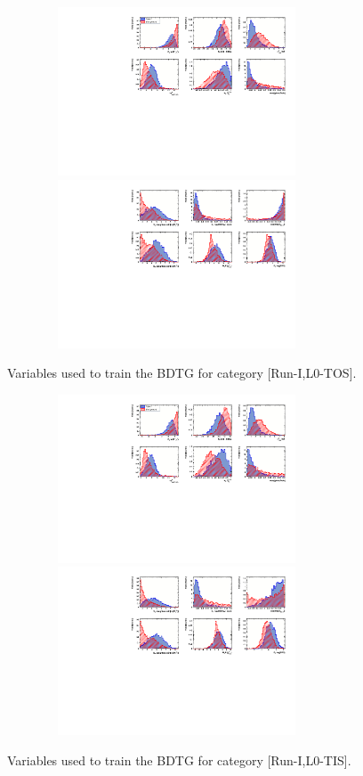 \setcounter{figure}{0}
\setcounter{table}{0}

\renewcommand{\thefigure}{C.\arabic{figure}}
\renewcommand{\thetable}{C.\arabic{table}}

\begin{figure}[h]
\centering
\includegraphics[height=5cm,width=0.9\textwidth]{figs/TMVA/BDTG_Data_run1_t0_all/variables_id_c1.pdf}
\includegraphics[height=5cm,width=0.9\textwidth]{figs/TMVA/BDTG_Data_run1_t0_all/variables_id_c2.pdf}
\caption{Variables used to train the BDTG for category [Run-I,\textsf{L0-TOS}].}
\label{fig:}
\includegraphics[height=5cm,width=0.9\textwidth]{figs/TMVA/BDTG_Data_run1_t1_all/variables_id_c1.pdf}
\includegraphics[height=5cm,width=0.9\textwidth]{figs/TMVA/BDTG_Data_run1_t1_all/variables_id_c2.pdf}
\caption{Variables used to train the BDTG for category [Run-I,\textsf{L0-TIS}].}
\label{fig:}
\end{figure}

